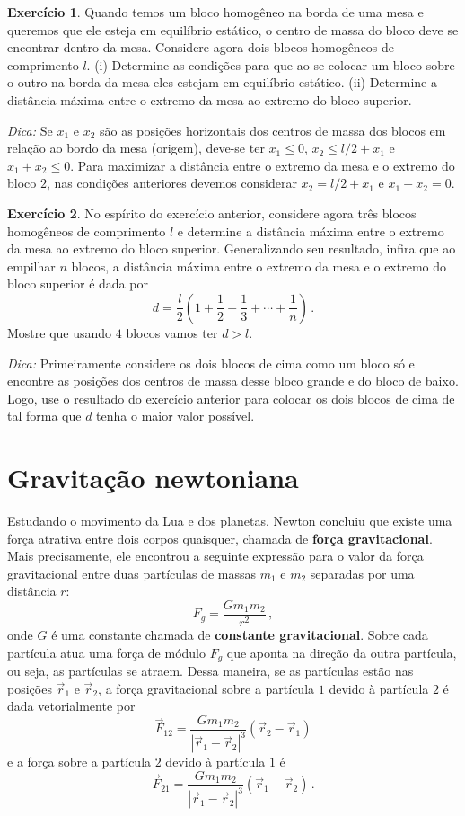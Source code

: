 \documentclass[12pt,a4paper]{article}
\newcommand{\dpar}[1]{\left(#1\right)}
\theoremstyle{definition}
\newtheorem{ex}{Exercício}[section]
\begin{document}
\begin{ex}
  Quando temos um bloco homogêneo na borda de uma mesa e queremos que
  ele esteja em equilíbrio estático, o centro de massa do bloco deve
  se encontrar dentro da mesa. Considere agora dois blocos homogêneos
  de comprimento $l$. (i) Determine as condições para que ao se
  colocar um bloco sobre o outro na borda da mesa eles estejam em
  equilíbrio estático. (ii) Determine a distância máxima entre o
  extremo da mesa ao extremo do bloco superior.

  \noindent\textit{Dica:} Se $x_1$ e $x_2$ são as posições horizontais
  dos centros de massa dos blocos em relação ao bordo da mesa
  (origem), deve-se ter $x_1\le 0$, $x_2\le l/2+x_1$ e $x_1+x_2\le
  0$. Para maximizar a distância entre o extremo da mesa e o extremo
  do bloco $2$, nas condições anteriores devemos considerar
  $x_2=l/2+x_1$ e $x_1+x_2=0$.
\end{ex}

\begin{ex}
  No espírito do exercício anterior, considere agora três blocos
  homogêneos de comprimento $l$ e determine a distância máxima entre o
  extremo da mesa ao extremo do bloco superior. Generalizando seu
  resultado, infira que ao empilhar $n$ blocos, a distância máxima
  entre o extremo da mesa e o extremo do bloco superior é dada por
  $$d=\frac{l}{2}\dpar{1+\frac{1}{2}+\frac{1}{3}+\cdots+\frac{1}{n}}\,.$$
  Mostre que usando $4$ blocos vamos ter $d>l$.

  \noindent\textit{Dica:} Primeiramente considere os dois blocos de
  cima como um bloco só e encontre as posições dos centros de massa
  desse bloco grande e do bloco de baixo. Logo, use o resultado do
  exercício anterior para colocar os dois blocos de cima de tal forma
  que $d$ tenha o maior valor possível.
\end{ex}

\section{Gravitação newtoniana}

Estudando o movimento da Lua e dos planetas, Newton concluiu que
existe uma força atrativa entre dois corpos quaisquer, chamada de
\textbf{força gravitacional}. Mais precisamente, ele encontrou a
seguinte expressão para o valor da força gravitacional entre duas
partículas de massas $m_1$ e $m_2$ separadas por uma distância $r$:
$$F_g=\frac{Gm_1m_2}{r^2}\,,$$
onde $G$ é uma constante chamada de \textbf{constante gravitacional}.
Sobre cada partícula atua uma força de módulo $F_g$ que aponta na
direção da outra partícula, ou seja, as partículas se atraem. Dessa
maneira, se as partículas estão nas posições $\vec r_1$ e $\vec r_2$,
a força gravitacional sobre a partícula $1$ devido à partícula $2$ é
dada vetorialmente por
$$\vec F_{12}=\frac{Gm_1m_2}{|\vec r_1-\vec r_2|^3}(\vec r_2-\vec r_1)$$
e a força sobre a partícula $2$ devido à partícula $1$ é
$$\vec F_{21}=\frac{Gm_1m_2}{|\vec r_1-\vec r_2|^3}(\vec r_1-\vec r_2)\,.$$
\end{document}
